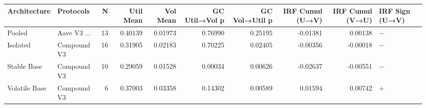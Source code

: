 \begin{tabular}{llrrrrrrrl}
\toprule
Architecture & Protocols & N & Util Mean & Vol Mean & GC Util→Vol p & GC Vol→Util p & IRF Cumul (U→V) & IRF Cumul (V→U) & IRF Sign (U→V) \\
\midrule
Pooled & Aave V3 ... & 13 & 0.40139 & 0.01973 & 0.76990 & 0.25195 & -0.01381 & 0.00138 & − \\
Isolated & Compound V3 & 16 & 0.31905 & 0.02183 & 0.70225 & 0.02405 & -0.00356 & -0.00018 & − \\
Stable Base & Compound V3 & 10 & 0.29059 & 0.01528 & 0.00034 & 0.00626 & -0.02637 & -0.00551 & − \\
Volatile Base & Compound V3 & 6 & 0.37003 & 0.03358 & 0.14302 & 0.00589 & 0.01594 & 0.00742 & + \\
\bottomrule
\end{tabular}
